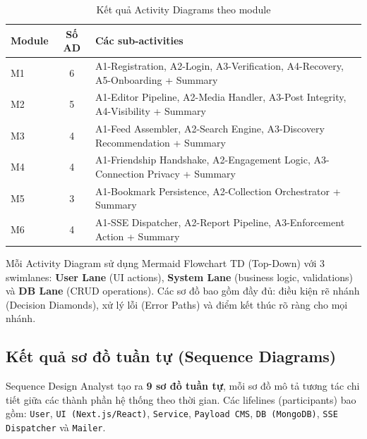 \documentclass[13pt,a4paper,oneside]{extreport}
\numberwithin{equation}{chapter}
\numberwithin{figure}{chapter}
\numberwithin{table}{chapter}
\begin{document}
\begin{table}[H]
\centering
\caption{Kết quả Activity Diagrams theo module}
\label{tab:activity-results}
\begin{tabular}{|p{1cm}|c|p{8cm}|}
\hline
\textbf{Module} & \textbf{Số AD} & \textbf{Các sub-activities} \\
\hline
M1 & 6 & A1-Registration, A2-Login, A3-Verification, A4-Recovery, A5-Onboarding + Summary \\
\hline
M2 & 5 & A1-Editor Pipeline, A2-Media Handler, A3-Post Integrity, A4-Visibility + Summary \\
\hline
M3 & 4 & A1-Feed Assembler, A2-Search Engine, A3-Discovery Recommendation + Summary \\
\hline
M4 & 4 & A1-Friendship Handshake, A2-Engagement Logic, A3-Connection Privacy + Summary \\
\hline
M5 & 3 & A1-Bookmark Persistence, A2-Collection Orchestrator + Summary \\
\hline
M6 & 4 & A1-SSE Dispatcher, A2-Report Pipeline, A3-Enforcement Action + Summary \\
\hline
\end{tabular}
\end{table}

Mỗi Activity Diagram sử dụng Mermaid Flowchart TD (Top-Down) với 3 swimlanes: \textbf{User Lane} (UI actions), \textbf{System Lane} (business logic, validations) và \textbf{DB Lane} (CRUD operations). Các sơ đồ bao gồm đầy đủ: điều kiện rẽ nhánh (Decision Diamonds), xử lý lỗi (Error Paths) và điểm kết thúc rõ ràng cho mọi nhánh.

\subsection{Kết quả sơ đồ tuần tự (Sequence Diagrams)}

Sequence Design Analyst tạo ra \textbf{9 sơ đồ tuần tự}, mỗi sơ đồ mô tả tương tác chi tiết giữa các thành phần hệ thống theo thời gian. Các lifelines (participants) bao gồm: \texttt{User}, \texttt{UI (Next.js/React)}, \texttt{Service}, \texttt{Payload CMS}, \texttt{DB (MongoDB)}, \texttt{SSE Dispatcher} và \texttt{Mailer}.
\end{document}
